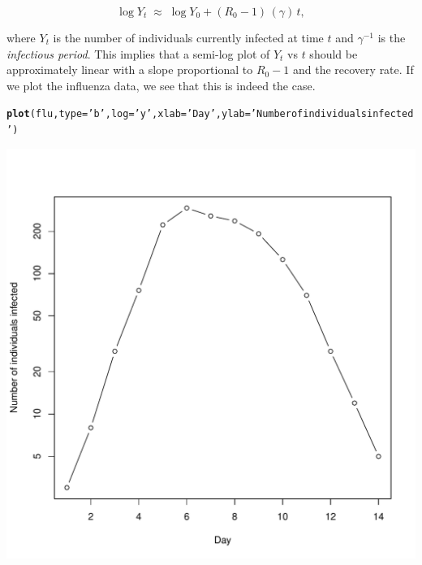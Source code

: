 \documentclass{article}\usepackage[]{graphicx}\usepackage[]{color}
\makeatletter
\def\maxwidth{ %
  \ifdim\Gin@nat@width>\linewidth
    \linewidth
  \else
    \Gin@nat@width
  \fi
}
\newcommand{\hlstr}[1]{\textcolor[rgb]{0.192,0.494,0.8}{#1}}%
\newcommand{\hlstd}[1]{\textcolor[rgb]{0.345,0.345,0.345}{#1}}%
\newcommand{\hlkwc}[1]{\textcolor[rgb]{0.333,0.667,0.333}{#1}}%
\newcommand{\hlkwd}[1]{\textcolor[rgb]{0.737,0.353,0.396}{\textbf{#1}}}%
\newenvironment{kframe}{%
 \def\at@end@of@kframe{}%
 \ifinner\ifhmode%
  \def\at@end@of@kframe{\end{minipage}}%
  \begin{minipage}{\columnwidth}%
 \fi\fi%
 \def\FrameCommand##1{\hskip\@totalleftmargin \hskip-\fboxsep
 \colorbox{shadecolor}{##1}\hskip-\fboxsep
     \hskip-\linewidth \hskip-\@totalleftmargin \hskip\columnwidth}%
 \MakeFramed {\advance\hsize-\width
   \@totalleftmargin\z@ \linewidth\hsize
   \@setminipage}}%
 {\par\unskip\endMakeFramed%
 \at@end@of@kframe}
\newenvironment{knitrout}{}{} %
\theoremstyle{exercise}
\makeatother
\begin{document}
\begin{equation*}
  \log{Y_t}\;\approx\;\log{Y_0}+(R_0-1)\,(\gamma)\,t, 
\end{equation*}

where $Y_t$ is the number of individuals currently infected at time $t$ and $\gamma^{-1}$ is the \textit{infectious period}. This implies that a semi-log plot of $Y_t$ vs $t$ should be approximately linear with a slope proportional to $R_0-1$ and the recovery rate. If we plot the influenza data, we see that this is indeed the case.

\begin{knitrout}
\color{fgcolor}\begin{kframe}
\begin{alltt}
\hlkwd{plot}\hlstd{(flu,} \hlkwc{type}\hlstd{=}\hlstr{'b'}\hlstd{,} \hlkwc{log}\hlstd{=}\hlstr{'y'}\hlstd{,} \hlkwc{xlab}\hlstd{=}\hlstr{'Day'}\hlstd{,} \hlkwc{ylab}\hlstd{=}\hlstr{'Number of individuals infected'}\hlstd{)}
\end{alltt}
\end{kframe}
\includegraphics[width=\maxwidth]{figure/unnamed-chunk-19-1} 

\end{knitrout}
\end{document}

